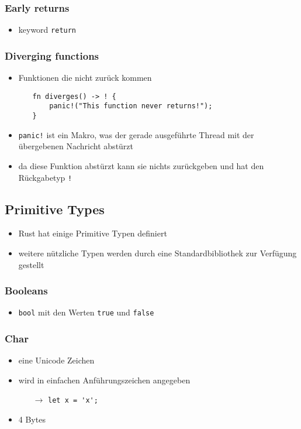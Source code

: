 \documentclass[a4paper,12pt]{article}
\begin{document}
\subsubsection*{Early returns}
	\begin{itemize}
	  \item keyword \verb|return|
	\end{itemize}
\subsubsection*{Diverging functions}
	\begin{itemize}
	  \item Funktionen die nicht zurück kommen
	  \begin{itemize}
	      \item[]
	      \begin{verbatim}
fn diverges() -> ! {
    panic!("This function never returns!");
}
	      \end{verbatim}
	  \end{itemize}
	  \item \verb|panic!| ist ein Makro, was der gerade ausgeführte Thread mit der übergebenen Nachricht abstürzt
	  \item da diese Funktion abstürzt kann sie nichts zurückgeben und hat den Rückgabetyp \verb|!|
	\end{itemize}
	
\subsection{Primitive Types}
	\begin{itemize}
	  \item Rust hat einige Primitive Typen definiert
	  \item weitere nützliche Typen werden durch eine Standardbibliothek zur Verfügung gestellt
	\end{itemize}
\subsubsection*{Booleans}
	\begin{itemize}
	  \item \verb|bool| mit den Werten \verb|true| und \verb|false|
	\end{itemize}
\subsubsection*{Char}
	\begin{itemize}
	  \item eine Unicode Zeichen
	  \item wird in einfachen Anführungszeichen angegeben
	  \begin{itemize}
	      \item[$\rightarrow$] \verb|let x = 'x';| 
	  \end{itemize}
	  \item 4 Bytes
	\end{itemize}
	
\end{document}
